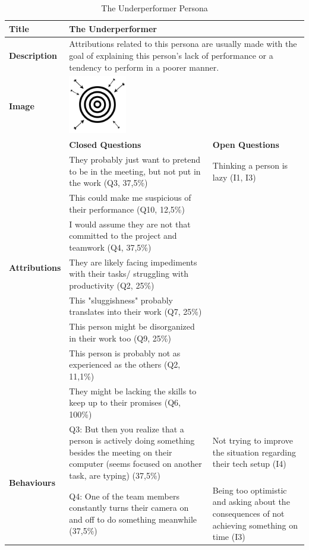 \begin{longtable}[ht]{ p{}  p{} p{} }
\caption{The Underperformer Persona}
\label{tab:underperformer}\\
\hline
\textbf{Title} & The Underperformer \\
    \hline
   \textbf{Description} &  \multicolumn{2}{p{.80\textwidth}}{Attributions related to this persona are usually made with the goal of explaining this person's lack of performance or a tendency to perform in a poorer manner.} \\
   \hline
   \textbf{Image} &  \includegraphics[valign=t, width=1in, margin=0pt 3pt 0pt 3pt]{figures/OffTarget.png} \\
   \hline
    & \textbf{Closed Questions} & \textbf{Open Questions} \\
    \hline
    \multirow{7}{4cm}{\textbf{Attributions}}  & They probably just want to pretend to be in the meeting, but not put in the work (Q3, 37,5\%) & Thinking a person is lazy (I1, I3) \\
     & This could make me suspicious of their performance (Q10, 12,5\%) \\
     & I would assume they are not that committed to the project and teamwork (Q4, 37,5\%) \\
     & They are likely facing impediments with their tasks/ struggling with productivity (Q2, 25\%) \\
     & This "sluggishness" probably translates into their work (Q7, 25\%) \\
 	 & This person might be disorganized in their work too (Q9, 25\%) \\
 	 & This person is probably not as experienced as the others  (Q2, 11,1\%) \\
 	 & They might be lacking the skills to keep up to their promises (Q6, 100\%) \\
    \hline
    \multirow{5}{4cm}{\textbf{Behaviours}}  & Q3: But then you realize that a person is actively doing something besides the meeting on their computer (seems focused on another task, are typing) (37,5\%)  & Not trying to improve the situation regarding their tech setup (I4) \\
     & Q4: One of the team members constantly turns their camera on and off to do something meanwhile (37,5\%) & Being too optimistic and asking about the consequences of not achieving something on time (I3) \\

\end{longtable}
